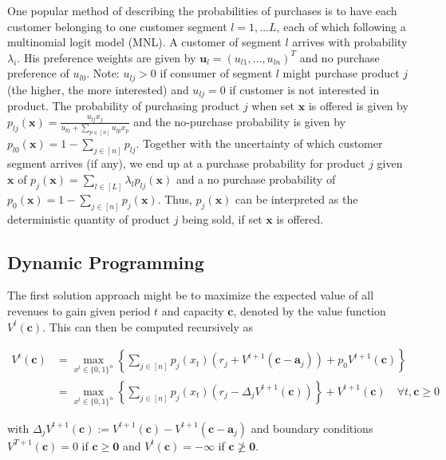 One popular method of describing the probabilities of purchases is to have each customer belonging to one customer segment $l = 1, \dots L$, each of which following a multinomial logit model (MNL). A customer of segment $l$ arrives with probability $\lambda_i$. His preference weights are given by $\boldsymbol{u}_l = (u_{l1}, \dots, u_{ln})^T$ and no purchase preference of $u_{l0}$. Note: $u_{lj} > 0$ if consumer of segment $l$ might purchase product $j$ (the higher, the more interested) and $u_{lj} = 0$ if customer is not interested in product. The probability of purchasing product $j$ when set $\boldsymbol{x}$ is offered is given by $p_{lj}(\boldsymbol{x}) = \frac{u_{lj}x_j}{u_{l0} + \sum_{p\in[n]} u_{lp}x_p}$ and the no-purchase probability is given by $p_{l0}(\boldsymbol{x}) = 1 - \sum_{j\in[n]}p_{lj}$. Together with the uncertainty of which customer segment arrives (if any), we end up at a purchase probability for product $j$ given $\boldsymbol{x}$ of $p_j(\boldsymbol{x}) = \sum_{l \in [L]} \lambda_l p_{lj}(\boldsymbol{x})$ and a no purchase probability of $p_0(\boldsymbol{x}) = 1-\sum_{j\in[n]}p_j(\boldsymbol{x}) $. Thus, $p_j(\boldsymbol{x})$ can be interpreted as the deterministic quantity of product $j$ being sold, if set $\boldsymbol{x}$ is offered.

\subsection{Dynamic Programming}

The first solution approach might be to maximize the expected value of all revenues to gain given period $t$ and capacity $\boldsymbol{c}$, denoted by the value function $V^t(\boldsymbol{c})$. This can then be computed recursively as

\begin{align}
	V^t(\boldsymbol{c}) &= \max_{x^t \in \{0,1\}^n}\left\{ \sum_{j \in [n]} p_j(x_t) \left( r_j + V^{t+1}(\boldsymbol{c} - \boldsymbol{a}_j) \right) + p_0 V^{t+1}(\boldsymbol{c}) \right\} \label{eq-Bellman}\\
	&= \max_{x^t \in \{0,1\}^n}\left\{ \sum_{j \in [n]} p_j(x_t) \left( r_j - \Delta_j V^{t+1}(\boldsymbol{c}) \right) \right\} + V^{t+1}(\boldsymbol{c})\quad \forall t, \boldsymbol{c} \geq 0
\end{align}

with $\Delta_j V^{t+1}(\boldsymbol{c}) := V^{t+1}(\boldsymbol{c}) - V^{t+1}(\boldsymbol{c} - \boldsymbol{a}_j)$ and boundary conditions $V^{T+1}(\boldsymbol{c}) = 0$ if $\boldsymbol{c} \geq \boldsymbol{0}$ and $V^t(\boldsymbol{c}) = - \infty$ if $\boldsymbol{c} \ngeq \boldsymbol{0}$.

